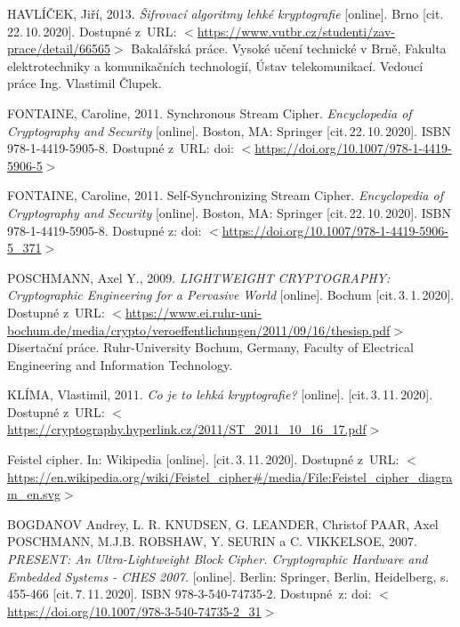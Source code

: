 \begin{thebibliography}{99}
    HAVLÍČEK, Jiří, 
    2013. 
    \emph{Šifrovací algoritmy lehké kryptografie} 
    [online]. 
    Brno 
    [cit.\,22.\,10.\,2020]. 
    Dostupné z~URL: \(<\)\url{https://www.vutbr.cz/studenti/zav-prace/detail/66565}\(>\)
    Bakalářská práce. 
    Vysoké učení technické v Brně, 
    Fakulta elektrotechniky a komunikačních technologií, 
    Ústav telekomunikací. 
    Vedoucí práce Ing. Vlastimil Člupek.
    
    \label{source:synchronous}
    FONTAINE, Caroline, 
    2011. 
    Synchronous Stream Cipher.
    \emph{Encyclopedia of Cryptography and Security} 
    [online]. 
    Boston, MA: Springer 
    [cit.\,22.\,10.\,2020]. 
    ISBN 978-1-4419-5905-8.
    Dostupné z~URL: doi: \(<\)\url{https://doi.org/10.1007/978-1-4419-5906-5}\(>\)
    
    \label{source:asynchronous}
    FONTAINE, Caroline, 
    2011. 
    Self-Synchronizing Stream Cipher. 
    \emph{Encyclopedia of Cryptography and Security} 
    [online]. 
    Boston, MA: Springer 
   [cit.\,22.\,10.\,2020].  
    ISBN 978-1-4419-5905-8. 
    Dostupné z: doi: \(<\)\url{https://doi.org/10.1007/978-1-4419-5906-5_371}\(>\)
    
    \label{source:poschmannCrypto}
    POSCHMANN, Axel Y., 
    2009. 
    \emph{LIGHTWEIGHT CRYPTOGRAPHY: Cryptographic Engineering for a Pervasive World} 
    [online]. 
    Bochum 
    [cit.\,3.\,1.\,2020]. 
    Dostupné z~URL: \(<\)\url{https://www.ei.ruhr-uni-bochum.de/media/crypto/veroeffentlichungen/2011/09/16/thesisp.pdf}\(>\) 
    Disertační práce. 
    Ruhr-University Bochum, 
    Germany, 
    Faculty of Electrical Engineering and Information Technology.
    
    \label{klima}
    KLÍMA, Vlastimil, 
    2011. 
    \emph{Co je to lehká kryptografie?} 
    [online]. 
    [cit.\,3.\,11.\,2020].  
    Dostupné z~URL: \(<\)\url{https://cryptography.hyperlink.cz/2011/ST_2011_10_16_17.pdf}\(>\)
    
    \label{source:FeistelCipher}
    Feistel cipher. 
    In: Wikipedia 
    [online]. 
    [cit.\,3.\,11.\,2020].  
    Dostupné z~URL: \(<\)\url{https://en.wikipedia.org/wiki/Feistel_cipher#/media/File:Feistel_cipher_diagram_en.svg}\(>\)
    
    \label{source:PRESENT}
    BOGDANOV Andrey, L. R. KNUDSEN, G. LEANDER, Christof PAAR, Axel POSCHMANN, M.J.B. ROBSHAW, Y. SEURIN a C. VIKKELSOE, 
    2007. 
    \emph{PRESENT: An Ultra-Lightweight Block Cipher. Cryptographic Hardware and Embedded Systems - CHES 2007.}
    [online]. 
    Berlin: Springer, Berlin, Heidelberg, 
    s. 455-466 
    [cit.\,7.\,11.\,2020]. 
    ISBN 978-3-540-74735-2. 
    Dostupné~z: doi: \(<\)\url{https://doi.org/10.1007/978-3-540-74735-2_31}\(>\)
    

\end{thebibliography}
